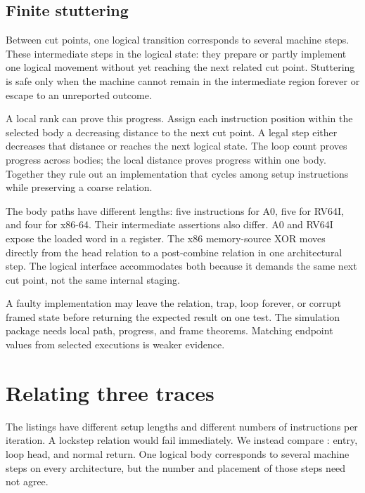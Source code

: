 \subsection{Finite stuttering}

Between cut points, one logical transition corresponds to several machine
steps. These intermediate steps  in the logical
state: they prepare or partly implement one logical movement without yet
reaching the next related cut point. Stuttering is safe only when the machine
cannot remain in the intermediate region forever or escape to an unreported
outcome.

A local rank can prove this progress. Assign each instruction position within
the selected body a decreasing distance to the next cut point. A legal step
either decreases that distance or reaches the next logical state. The loop
count proves progress across bodies; the local distance proves progress within
one body. Together they rule out an implementation that cycles among setup
instructions while preserving a coarse relation.

The body paths have different lengths: five instructions for A0, five for
RV64I, and four for x86-64. Their intermediate assertions also differ. A0 and
RV64I expose the loaded word in a register. The x86 memory-source XOR moves
directly from the head relation to a post-combine relation in one architectural
step. The logical interface accommodates both because it demands the same
next cut point, not the same internal staging.

\begin{warning}[title={A relation that holds only at the beginning and end is not enough}]
A faulty implementation may leave the relation, trap, loop forever, or corrupt
framed state before returning the expected result on one test. The simulation
package needs local path, progress, and frame theorems. Matching endpoint
values from selected executions is weaker evidence.
\end{warning}

\section{Relating three traces}

The listings have different setup lengths and different numbers of
instructions per iteration. A lockstep relation would fail immediately. We
instead compare : entry, loop head, and normal return. One
logical body corresponds to several machine steps on every architecture, but
the number and placement of those steps need not agree.

